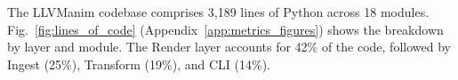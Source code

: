The LLVManim codebase comprises 3{,}189 lines of Python across 18 modules. Fig.~\ref{fig:lines_of_code} (Appendix~\ref{app:metrics_figures}) shows the breakdown by layer and module. The Render layer accounts for 42\% of the code, followed by Ingest (25\%), Transform (19\%), and CLI (14\%).
